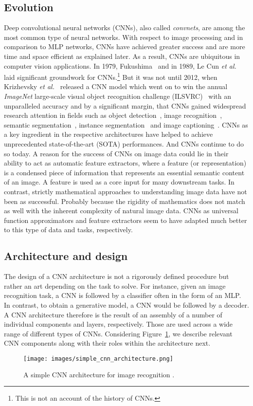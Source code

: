 \documentclass[a4paper,12pt]{report}
\begin{document}
\subsection{Evolution}
Deep convolutional neural networks (CNNs), also called \textit{convnets}, are among the most common type of neural networks. With respect to image processing and in comparison to MLP networks, CNNs have achieved greater success and are more time and space efficient as explained later. As a result, CNNs are ubiquitous in computer vision applications. In 1979, Fukushima~\cite{FukushimaCnn79} and in 1989, Le Cun \textit{et al.}~\cite{CunGrounworkCNNs} laid significant groundwork for CNNs.\footnote{This is not an account of the history of CNNs.} But it was not until 2012, when Krizhevsky \textit{et al.}~\cite{AlexNet} released a CNN model which went on to win the annual \textit{ImageNet} large-scale visual object recognition challenge (ILSVRC)~\cite{Imagenet} with an unparalleled accuracy and by a significant margin, that CNNs gained widespread research attention in fields such as object detection~\cite{FasterRCNN}, image recognition~\cite{AlexNet,DenseNet}, semantic segmentation~\cite{DeepLabv3+}, instance segmentation~\cite{MaskScoringRCNN} and image captioning~\cite{ImageCaptioningSOTA}. CNNs as a key ingredient in the respective architectures have helped to achieve unprecedented state-of-the-art (SOTA) performances. And CNNs continue to do so today. A reason for the success of CNNs on image data could lie in their ability to act as automatic feature extractors, where a feature (or representation) is a condensed piece of information that represents an essential semantic content of an image. A feature is used as a core input for many downstream tasks. In contrast, strictly mathematical approaches to understanding image data have not been as successful. Probably because the rigidity of mathematics does not match as well with the inherent complexity of natural image data. CNNs as universal function approximators and feature extractors seem to have adapted much better to this type of data and tasks, respectively.

\subsection{Architecture and design}
The design of a CNN architecture is not a rigorously defined procedure but rather an art depending on the task to solve. For instance, given an image recognition task, a CNN is followed by a classifier often in the form of an MLP. In contrast, to obtain a generative model, a CNN would be followed by a decoder. A CNN architecture therefore is the result of an assembly of a number of individual components and layers, respectively. Those are used across a wide range of different types of CNNs. Considering Figure~\ref{fig:simple_cnn_arch}, we describe relevant CNN components along with their roles within the architecture next. 
\begin{figure}[H]
\centering
\texttt{[image: images/simple\_cnn\_architecture.png]}
\caption{A simple CNN architecture for image recognition \cite{cnn_arch_article}.}
\label{fig:simple_cnn_arch}
\end{figure}
\end{document}
